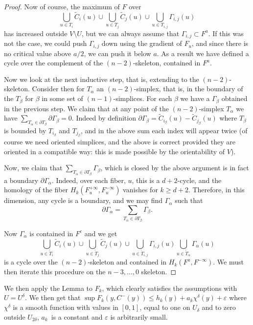 \documentclass[JEP,XML,SOM,NoFloatCountersInSection,Unicode,published]{cedram}
\numberwithin{equation}{section}
\theoremstyle{plain}
\theoremstyle{definition}
\theoremstyle{remark}
\begin{document}
\begin{proof}
Now of course, the maximum of $F$ over
\[
\bigcup_{u\in T_{i} }{\widetilde C}_{i}(u)\cup \bigcup_{u\in T_{j}} {\widetilde C}_{j}(u)\cup \bigcup_{u\in T_{i,j} }{\Gamma}_{i,j}(u)
\]
has increased outside $V\setminus U$, but we can always assume that $\Gamma_{i,j}\subset F^{a}$. If this was not the case, we could push $\Gamma_{i,j}$ down using the gradient of $F_u$, and since there is no critical value above $a/2$, we can push it below $a$.
As a result we have defined a cycle over the complement of the $(n-2)$-skeleton, contained in $F^a$.

Now we look at the next inductive step, that is, extending to the $(n-2)$-skeleton. Consider then for $T_{\alpha}$ an $(n-2)$-simplex, that is, in the boundary of the $T_{\beta}$ for $\beta$ in some set of $(n-1)$-simplices. For each $\beta$ we have a $\Gamma_{\beta}$ obtained in the previous step.
We claim that at any point of the $(n-2)$-simplex $T_{\alpha}$ we have $\sum_{T_{\alpha} \in \partial T_{\beta}} \partial \Gamma_{\beta}=0$. Indeed by definition $\partial \Gamma_{\beta}= \widetilde C_{i_{\beta}}(u)-\widetilde C_{j_{\beta}}(u)$ where $T_{\beta}$ is bounded by $T_{i_{\beta}}$ and $T_{j_{\beta}}$, and in the above sum each index will appear twice (of course we need oriented simplices, and the above is correct provided they are oriented in a compatible way: this is made possible by the orientability of $V$).

Now, we claim that $\sum_{T_{\alpha} \in \partial T_{\beta}} \Gamma_{\beta}$, which is closed by the above argument is in fact a boundary $\partial \Gamma_{\alpha}$. Indeed, over each fiber, $u$, this is a $d+2$-cycle, and
the homology of the fiber $H_{k}(F_{u}^{+\infty}, F_u^{-\infty})$ vanishes for $k\geq d+2$. Therefore, in this dimension, any cycle is a boundary, and we may find $\Gamma_{\alpha}$ such that
\[
\partial \Gamma_{\alpha}=\sum_{T_{\alpha} \in \partial T_{\beta}} \Gamma_{\beta}.
\]

Now $\Gamma_{\alpha}$ is contained in $F^{c}$ and we get
\[
\bigcup_{u\in \mathring{T}_{i} }{\widetilde C}_{i}(u)\cup \bigcup_{u\in \mathring{T}_{j} }{\widetilde C}_{j}(u)\cup \bigcup_{u\in \mathring{T}_{i,j} }{\Gamma}_{i,j}(u) \bigcup_{u\in \mathring{T}_\alpha} \Gamma_{\alpha}(u)
\]
is a cycle over the $(n-2)$-skeleton and contained in $H_{k}(F^{a}, F^{-\infty})$.
We must then iterate this procedure on the $n-3,\dots,0$ skeleton.
\end{proof}

We then apply the Lemma to $F_{k}$, which clearly satisfies the assumptions with $U=U^\delta$. We then get that $\sup {F}_{k}(y, C^-(y)) \leq {h}_{k} (y) + a_k \chi^{\delta}
(y) + \varepsilon$ where $\chi^{\delta}$ is a smooth function with values in $[0,1]$, equal to one
on $U_{\delta}$ and to zero outside $U_{2\delta}$, $a_k$~is a constant
and $ \varepsilon$ is arbitrarily small.
\end{document}
